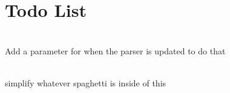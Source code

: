 \chapter{Todo List }
\hypertarget{todo}{}\label{todo}

\begin{DoxyRefList}
\item[{\parbox[t]{\linewidth}{Member \doxylink{classFile_a58521685afcf0aa7659e34d003f46868}{File::\+File} (\doxylink{structparser_1_1Options}{parser::\+\+Options} const \&options)}}]\hfill \\
\label{todo__todo000002}%
%
Add a parameter for  when the parser is updated to do that  
\item[{\parbox[t]{\linewidth}{Member \doxylink{namespaceparser_a7f5ecbf764fc175fc336fcea0dd07be8}{parser::\+parse} (int argc, char \texorpdfstring{$\ast$}{*}argv\+[]\+)}}]\hfill \\
\label{todo__todo000001}%
%
simplify whatever spaghetti is inside of this 
\end{DoxyRefList}